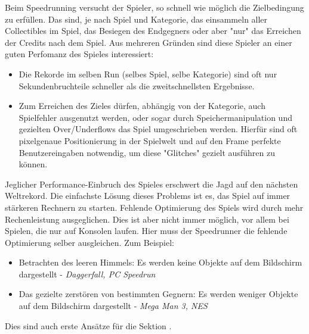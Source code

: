 Beim Speedrunning versucht der Spieler, so schnell wie möglich die Zielbedingung zu erfüllen. Das sind, je nach Spiel und Kategorie, das einsammeln aller Collectibles im Spiel, das Besiegen des Endgegners oder aber "nur" das Erreichen der Credits nach dem Spiel. Aus mehreren Gründen sind diese Spieler an einer guten Perfomanz des Spieles interessiert:

\begin{itemize}
\item Die Rekorde im selben Run (selbes Spiel, selbe Kategorie) sind oft nur Sekundenbruchteile schneller als die zweitschnellsten Ergebnisse.
\item Zum Erreichen des Zieles dürfen, abhängig von der Kategorie, auch Spielfehler ausgenutzt werden, oder sogar durch Speichermanipulation und gezielten Over/Underflows das Spiel umgeschrieben werden. Hierfür sind oft pixelgenaue Positionierung in der Spielwelt und auf den Frame perfekte Benutzereingaben notwendig, um diese "Glitches" gezielt ausführen zu können.
\end{itemize}

Jeglicher Performance-Einbruch des Spieles erschwert die Jagd auf den nächsten Weltrekord. Die einfachste Lösung dieses Problems ist es, das Spiel auf immer stärkeren Rechnern zu starten. Fehlende Optimierung des Spiels wird durch mehr Rechenleistung ausgeglichen.
Dies ist aber nicht immer möglich, vor allem bei Spielen, die nur auf Konsolen laufen. Hier muss der Speedrunner die fehlende Optimierung selber ausgleichen. Zum Beispiel:
\begin{itemize}
\item Betrachten des leeren Himmels: Es werden keine Objekte auf dem Bildschirm dargestellt - \emph{Daggerfall, PC Speedrun}
\item Das gezielte zerstören von bestimmten Gegnern: Es werden weniger Objekte auf dem Bildschirm dargestellt - \emph{Mega Man 3, NES }
\end{itemize}
Dies sind auch erste Ansätze für die Sektion .

